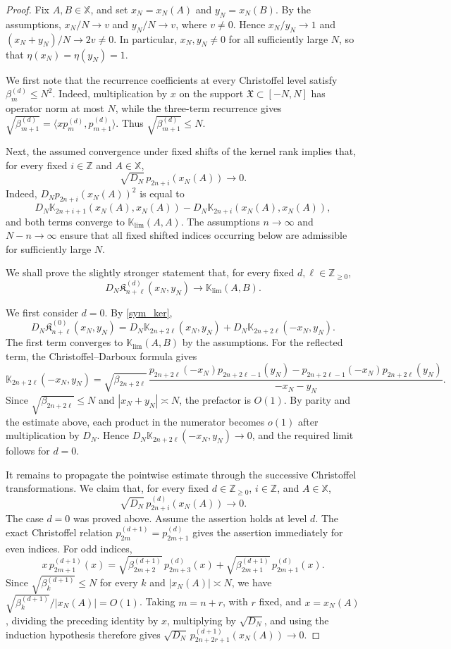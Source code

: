 \documentclass[reqno,11pt]{amsart}
\newcommand{\ZZ}{\mathbb{Z}}
\theoremstyle{plain}
\theoremstyle{definition}
\numberwithin{equation}{section}
\begin{document}
\begin{proof}
Fix $A,B\in\mathbb X$, and set $x_N=x_N(A)$ and $y_N=x_N(B)$.
By the assumptions, $x_N/N\to v$ and $y_N/N\to v$, where
$v\neq0$. Hence $x_N/y_N\to1$ and
$(x_N+y_N)/N\to2v\neq0$. In particular, $x_N,y_N\neq0$ for all
sufficiently large $N$, so that $\eta(x_N)=\eta(y_N)=1$.

We first note that the recurrence coefficients at every Christoffel
level satisfy $\beta_m^{(d)}\leq N^2$.
Indeed, multiplication by $x$ on the support
$\mathfrak X\subset[-N,N]$ has operator norm at most $N$, while the three-term recurrence gives
$\sqrt{\beta_{m+1}^{(d)}}=
\langle xp_m^{(d)},p_{m+1}^{(d)}\rangle$. Thus
$\sqrt{\beta_{m+1}^{(d)}}\leq N$.

Next, the assumed convergence under fixed shifts of the kernel rank
implies that, for every fixed $i\in\ZZ$ and $A\in\mathbb X$,
\[
\sqrt{D_N}\,p_{2n+i}(x_N(A))\longrightarrow0.
\]
Indeed,
$D_Np_{2n+i}(x_N(A))^2$ is equal to
\[
D_N\mathbb K_{2n+i+1}(x_N(A),x_N(A))
-
D_N\mathbb K_{2n+i}(x_N(A),x_N(A)),
\]
and both terms converge to $\mathbb K_{\lim}(A,A)$.
The assumptions $n\to\infty$ and $N-n\to\infty$ ensure that all
fixed shifted indices occurring below are admissible for sufficiently
large $N$.

We shall prove the slightly stronger statement that, for every fixed
$d,\ell\in\ZZ_{\geq0}$,
\[
D_N\mathfrak K_{n+\ell}^{(d)}(x_N,y_N)
\longrightarrow
\mathbb K_{\lim}(A,B).
\]

We first consider $d=0$. By \eqref{sym_ker},
\[
D_N\mathfrak K_{n+\ell}^{(0)}(x_N,y_N)
=
D_N\mathbb K_{2n+2\ell}(x_N,y_N)
+
D_N\mathbb K_{2n+2\ell}(-x_N,y_N).
\]
The first term converges to $\mathbb K_{\lim}(A,B)$ by the
assumptions. For the reflected term, the Christoffel--Darboux formula
gives
\[
\mathbb K_{2n+2\ell}(-x_N,y_N)
=
\sqrt{\beta_{2n+2\ell}}\,
\frac{
p_{2n+2\ell}(-x_N)p_{2n+2\ell-1}(y_N)
-
p_{2n+2\ell-1}(-x_N)p_{2n+2\ell}(y_N)
}{
-x_N-y_N
}.
\]
Since $\sqrt{\beta_{2n+2\ell}}\leq N$ and
$|x_N+y_N|\asymp N$, the prefactor is $O(1)$. By parity and the
estimate above, each product in the numerator becomes $o(1)$ after
multiplication by $D_N$. Hence
$D_N\mathbb K_{2n+2\ell}(-x_N,y_N)\to0$, and the required limit
follows for $d=0$.

It remains to propagate the pointwise estimate through the successive
Christoffel transformations. We claim that, for every fixed
$d\in\ZZ_{\geq0}$, $i\in\ZZ$, and $A\in\mathbb X$,
\[
\sqrt{D_N}\,p_{2n+i}^{(d)}(x_N(A))\longrightarrow0.
\]
The case $d=0$ was proved above. Assume the assertion holds at level
$d$. The exact Christoffel relation
$p_{2m}^{(d+1)}=p_{2m+1}^{(d)}$ gives the assertion immediately for
even indices. For odd indices,
\[
x\,p_{2m+1}^{(d+1)}(x)
=
\sqrt{\beta_{2m+2}^{(d+1)}}\,p_{2m+3}^{(d)}(x)
+
\sqrt{\beta_{2m+1}^{(d+1)}}\,p_{2m+1}^{(d)}(x).
\]
Since $\sqrt{\beta_k^{(d+1)}}\leq N$ for every $k$ and $|x_N(A)|\asymp N$, we have
$\sqrt{\beta_k^{(d+1)}}/|x_N(A)|=O(1)$.
Taking $m=n+r$, with $r$ fixed, and $x=x_N(A)$, dividing the preceding identity by $x$, multiplying by $\sqrt{D_N}$, and using the induction hypothesis therefore gives
$\sqrt{D_N}\,p_{2n+2r+1}^{(d+1)}(x_N(A))\to0$.


\end{proof}
\end{document}
